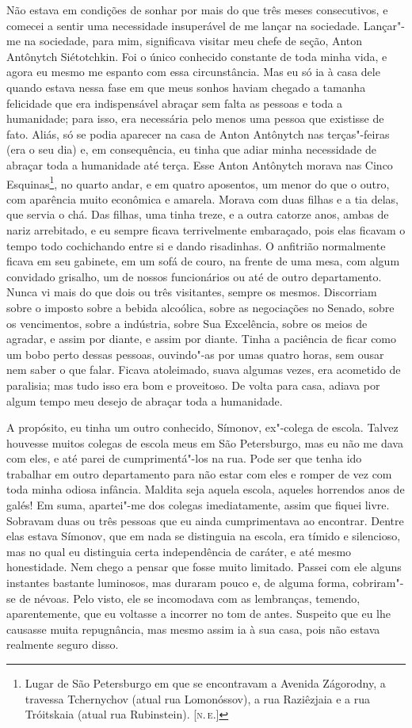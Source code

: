 Não estava em condições de sonhar por mais do que três meses
consecutivos, e comecei a sentir uma necessidade insuperável de me
lançar na sociedade. Lançar"-me na sociedade, para mim, significava
visitar meu chefe de seção, Anton Antônytch Siétotchkin. Foi o único
conhecido constante de toda minha vida, e agora eu mesmo me espanto com
essa circunstância. Mas eu só ia à casa dele quando estava nessa fase em
que meus sonhos haviam chegado a tamanha felicidade que era
indispensável abraçar sem falta as pessoas e toda a humanidade; para
isso, era necessária pelo menos uma pessoa que existisse de fato. Aliás,
só se podia aparecer na casa de Anton Antônytch nas terças"-feiras (era o
seu dia) e, em consequência, eu tinha que adiar minha necessidade de
abraçar toda a humanidade até terça. Esse Anton Antônytch morava nas
Cinco Esquinas\footnote{Lugar de São Petersburgo em que se encontravam a
  Avenida Zágorodny, a travessa Tchernychov (atual rua Lomonóssov), a
  rua Raziêzjaia e a rua Tróitskaia (atual rua Rubinstein). {[}\textsc{n.\,e.}{]}},
no quarto andar, e em quatro aposentos, um menor do que o outro, com
aparência muito econômica e amarela. Morava com duas filhas e a tia
delas, que servia o chá. Das filhas, uma tinha treze, e a outra catorze
anos, ambas de nariz arrebitado, e eu sempre ficava terrivelmente
embaraçado, pois elas ficavam o tempo todo cochichando entre si e dando
risadinhas. O anfitrião normalmente ficava em seu gabinete, em um sofá
de couro, na frente de uma mesa, com algum convidado grisalho, um de
nossos funcionários ou até de outro departamento. Nunca vi mais do que
dois ou três visitantes, sempre os mesmos. Discorriam sobre o imposto
sobre a bebida alcoólica, sobre as negociações no Senado, sobre os
vencimentos, sobre a indústria, sobre Sua Excelência, sobre os meios de
agradar, e assim por diante, e assim por diante. Tinha a paciência de
ficar como um bobo perto dessas pessoas, ouvindo"-as por umas quatro
horas, sem ousar nem saber o que falar. Ficava atoleimado, suava algumas
vezes, era acometido de paralisia; mas tudo isso era bom e proveitoso.
De volta para casa, adiava por algum tempo meu desejo de abraçar toda a
humanidade.

A propósito, eu tinha um outro conhecido, Símonov, ex"-colega de escola.
Talvez houvesse muitos colegas de escola meus em São Petersburgo, mas eu
não me dava com eles, e até parei de cumprimentá"-los na rua. Pode ser
que tenha ido trabalhar em outro departamento para não estar com eles e
romper de vez com toda minha odiosa infância. Maldita seja aquela
escola, aqueles horrendos anos de galés! Em suma, apartei"-me dos colegas
imediatamente, assim que fiquei livre. Sobravam duas ou três pessoas que
eu ainda cumprimentava ao encontrar. Dentre elas estava Símonov, que em
nada se distinguia na escola, era tímido e silencioso, mas no qual eu
distinguia certa independência de caráter, e até mesmo honestidade. Nem
chego a pensar que fosse muito limitado. Passei com ele alguns instantes
bastante luminosos, mas duraram pouco e, de alguma forma, cobriram"-se de
névoas. Pelo visto, ele se incomodava com as lembranças, temendo,
aparentemente, que eu voltasse a incorrer no tom de antes. Suspeito que
eu lhe causasse muita repugnância, mas mesmo assim ia à sua casa, pois
não estava realmente seguro disso.

